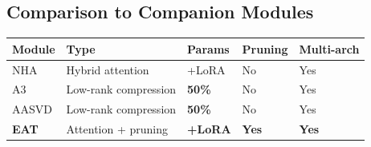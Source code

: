 \subsection{Comparison to Companion Modules}

\begin{table}[H]
\centering
\small
\begin{tabular}{lllll}
\toprule
\textbf{Module} & \textbf{Type} & \textbf{Params} & \textbf{Pruning} & \textbf{Multi-arch} \\
\midrule
NHA & Hybrid attention & +LoRA & No & Yes \\
A3 & Low-rank compression & \textbf{ 50\%} & No & Yes \\
AASVD & Low-rank compression & \textbf{ 50\%} & No & Yes \\
\textbf{EAT} & Attention + pruning & \textbf{+LoRA} & \textbf{Yes} & \textbf{Yes} \\
\bottomrule
\end{tabular}
\end{table}

